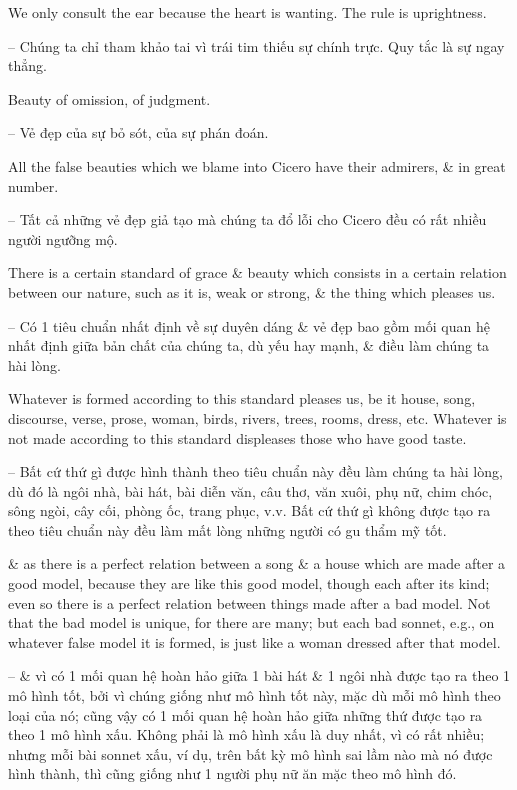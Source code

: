 \documentclass{article}
\begin{document}
\begin{enumerate}
\begin{itemize}
		 We only consult the ear because the heart is wanting. The rule is uprightness.
		
		-- Chúng ta chỉ tham khảo tai vì trái tim thiếu sự chính trực. Quy tắc là sự ngay thẳng.
		
		Beauty of omission, of judgment.
		
		-- Vẻ đẹp của sự bỏ sót, của sự phán đoán.
		
		 All the false beauties which we blame into Cicero have their admirers, \& in great number.
		
		-- Tất cả những vẻ đẹp giả tạo mà chúng ta đổ lỗi cho Cicero đều có rất nhiều người ngưỡng mộ.
		
		 There is a certain standard of grace \& beauty which consists in a certain relation between our nature, such as it is, weak or strong, \& the thing which pleases us.
		
		-- Có 1 tiêu chuẩn nhất định về sự duyên dáng \& vẻ đẹp bao gồm mối quan hệ nhất định giữa bản chất của chúng ta, dù yếu hay mạnh, \& điều làm chúng ta hài lòng.
		
		Whatever is formed according to this standard pleases us, be it house, song, discourse, verse, prose, woman, birds, rivers, trees, rooms, dress, etc. Whatever is not made according to this standard displeases those who have good taste.
		
		-- Bất cứ thứ gì được hình thành theo tiêu chuẩn này đều làm chúng ta hài lòng, dù đó là ngôi nhà, bài hát, bài diễn văn, câu thơ, văn xuôi, phụ nữ, chim chóc, sông ngòi, cây cối, phòng ốc, trang phục, v.v. Bất cứ thứ gì không được tạo ra theo tiêu chuẩn này đều làm mất lòng những người có gu thẩm mỹ tốt.
		
		\& as there is a perfect relation between a song \& a house which are made after a good model, because they are like this good model, though each after its kind; even so there is a perfect relation between things made after a bad model. Not that the bad model is unique, for there are many; but each bad sonnet, e.g., on whatever false model it is formed, is just like a woman dressed after that model.
		
		-- \& vì có 1 mối quan hệ hoàn hảo giữa 1 bài hát \& 1 ngôi nhà được tạo ra theo 1 mô hình tốt, bởi vì chúng giống như mô hình tốt này, mặc dù mỗi mô hình theo loại của nó; cũng vậy có 1 mối quan hệ hoàn hảo giữa những thứ được tạo ra theo 1 mô hình xấu. Không phải là mô hình xấu là duy nhất, vì có rất nhiều; nhưng mỗi bài sonnet xấu, ví dụ, trên bất kỳ mô hình sai lầm nào mà nó được hình thành, thì cũng giống như 1 người phụ nữ ăn mặc theo mô hình đó.
		

\end{itemize}
\end{enumerate}
\end{document}
